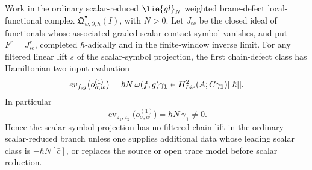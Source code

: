 \begin{prop}\label{prop:app-first-scalar-lift-obstruction}
  Work in the ordinary scalar-reduced \(\lie{gl}_N\) weighted
  brane-defect local-functional complex
  \(\mathfrak Q^\bullet_{w,\partial,\hbar}(I)\), with \(N>0\).  Let
  \(J_{\mathrm{sc}}\) be the closed ideal of functionals whose
  associated-graded scalar-contact symbol vanishes, and put
  \(F^r=J_{\mathrm{sc}}^r\), completed \(\hbar\)-adically and in the
  finite-window inverse limit.  For any filtered linear lift \(s\) of the
  scalar-symbol projection, the first chain-defect class has Hamiltonian
  two-input evaluation
  \[
    ev_{f,g}\bigl(o_{\sigma,w}^{(1)}\bigr)
      =
    \hbar N\,\omega(f,g)\gamma_{\mathbf 1}
      \in H^2_{Lie}(A;C\gamma_{\mathbf 1})[[\hbar]] .
  \]
  In particular
  \[
    \operatorname{ev}_{z_1,z_2}\bigl(o_{\sigma,w}^{(1)}\bigr)
      =\hbar N\,\gamma_{\mathbf 1}\neq0 .
  \]
  Hence the scalar-symbol projection has no filtered chain lift in the
  ordinary scalar-reduced branch unless one supplies additional data whose
  leading scalar class is \(-\hbar N[\bar c]\), or replaces the source or
  open trace model before scalar reduction.
\end{prop}

